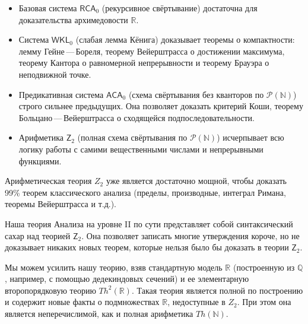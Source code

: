\documentclass[11pt, a4paper]{extarticle}
\newcommand{\Pcal}{{\mathcal P}}
\newcommand{\R}{{\mathbb R}}
\newcommand{\Q}{{\mathbb Q}}
\newcommand{\N}{{\mathbb N}}
\begin{document}
\begin{remark}
\begin{itemize}
    \item Базовая система $\mathsf{RCA}_0$ (рекурсивное свёртывание) достаточна для доказательства архимедовости $\R$.
    \item Система $\mathsf{WKL}_0$ (слабая лемма Кёнига) доказывает теоремы о компактности: лемму Гейне\,---\,Бореля, теорему Вейерштрасса о достижении максимума, теорему Кантора о равномерной непрерывности и теорему Брауэра о неподвижной точке.
    \item Предикативная система $\mathsf{ACA}_0$ (схема свёртывания без кванторов по $\Pcal(\N)$) строго сильнее предыдущих. Она позволяет доказать критерий Коши, теорему Больцано\,---\,Вейерштрасса о сходящейся подпоследовательности.
    \item Арифметика $\mathsf{Z}_2$ (полная схема свёртывания по $\Pcal(\N)$) исчерпывает всю логику работы с самими вещественными числами и непрерывными функциями.
\end{itemize}
Арифметическая теория $Z_2$ уже является достаточно мощной, чтобы доказать 99\% теорем классического анализа (пределы, производные, интеграл Римана, теоремы Вейерштрасса и т.д.). 

Наша теория Анализа на уровне II по сути представляет собой синтаксический сахар над теорией $\mathsf{Z}_2$. Она позволяет записать многие утверждения короче, но не доказывает никаких новых теорем, которые нельзя было бы доказать в теории $\mathsf{Z}_2$.
\end{remark}

Мы можем усилить нашу теорию, взяв стандартную модель $\R$ (построенную из $\Q$, например, с помощью дедекиндовых сечений) и ее элементарную второпорядковую теорию $Th^{2}(\R)$. Такая теория является полной по построению и содержит новые факты о подмножествах $\R$, недоступные в $Z_2$. При этом она является неперечислимой, как и полная арифметика $Th(\N)$.
\end{document}
